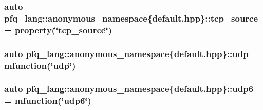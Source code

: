\hypertarget{namespacepfq__lang_1_1anonymous__namespace_02default_8hpp_03_a4b3ea94407fb5f52e5dfd9e2511f04a8}{
\subsubsection[{tcp\+\_\+source}]{\setlength{\rightskip}{0pt plus 5cm}auto pfq\+\_\+lang\+::anonymous\+\_\+namespace\{default.\+hpp\}\+::tcp\+\_\+source = {\bf property}(\char`\"{}tcp\+\_\+source\char`\"{})}}\label{namespacepfq__lang_1_1anonymous__namespace_02default_8hpp_03_a4b3ea94407fb5f52e5dfd9e2511f04a8}
\hypertarget{namespacepfq__lang_1_1anonymous__namespace_02default_8hpp_03_a1f18de2040dd9d74a07b1c535911abdf}{
\subsubsection[{udp}]{\setlength{\rightskip}{0pt plus 5cm}auto pfq\+\_\+lang\+::anonymous\+\_\+namespace\{default.\+hpp\}\+::udp = {\bf mfunction}(\char`\"{}udp\char`\"{})}}\label{namespacepfq__lang_1_1anonymous__namespace_02default_8hpp_03_a1f18de2040dd9d74a07b1c535911abdf}
\hypertarget{namespacepfq__lang_1_1anonymous__namespace_02default_8hpp_03_a84b7a888d00d5dfea606f7df96ba0ad3}{
\subsubsection[{udp6}]{\setlength{\rightskip}{0pt plus 5cm}auto pfq\+\_\+lang\+::anonymous\+\_\+namespace\{default.\+hpp\}\+::udp6 = {\bf mfunction}(\char`\"{}udp6\char`\"{})}}\label{namespacepfq__lang_1_1anonymous__namespace_02default_8hpp_03_a84b7a888d00d5dfea606f7df96ba0ad3}
